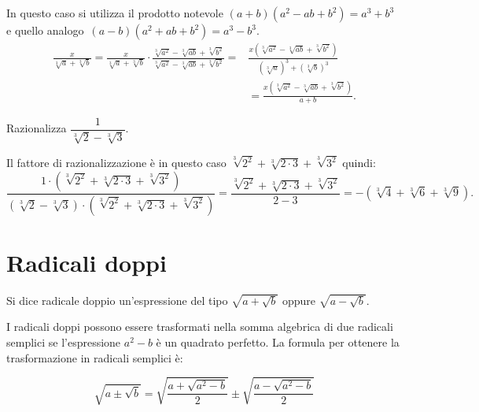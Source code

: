 In questo caso si utilizza il prodotto notevole $(a+b)(a^2-ab+b^2)=a^3+b^3$ e quello analogo~$(a-b)(a^2+ab+b^2)=a^3-b^3$.
\begin{align*}
\frac x{\sqrt[3]a+\sqrt[3]b}=\frac x{\sqrt[3]a+\sqrt[3]b}\cdot \frac{\sqrt[3]{a^2}-\sqrt[3]{ab}+\sqrt[3]{b^2}}{\sqrt[3]{a^2}-\sqrt[3]{ab}+\sqrt[3]{b^2}}=&\frac{x\left(\sqrt[3]{a^2}-\sqrt[3]{ab}+\sqrt[3]{b^2}\right)}{(\sqrt[3]a)^3+(\sqrt[3]b)^3}\\
&=\frac{x\left(\sqrt[3]{a^2}-\sqrt[3]{ab}+\sqrt[3]{b^2}\right)}{a+b}.
\end{align*}

\begin{exrig}
 \begin{esempio}
Razionalizza $\dfrac 1{\sqrt[3]{2}-\sqrt[3]{3}}$.

Il fattore di razionalizzazione è in questo caso $\sqrt[3]{2^2}+\sqrt[3]{2\cdot 3}+\sqrt[3]{3^2}$ quindi:
 \[\dfrac{1\cdot \left(\sqrt[3]{2^2}+\sqrt[3]{2\cdot 3}+\sqrt[3]{3^2}\right)}{\left(\sqrt[3]2-\sqrt[3]3\right)\cdot \left(\sqrt[3]{2^2}+\sqrt[3]{2\cdot 3}+\sqrt[3]{3^2}\right)}=\dfrac{\sqrt[3]{2^2}+\sqrt[3]{2\cdot 3}+\sqrt[3]{3^2}}{2-3}=-\left(\sqrt[3]4+\sqrt[3]6+\sqrt[3]9\right).\]
 \end{esempio}
\end{exrig}
\vspazio\ovalbox{\risolvii \ref{ese:2.68}, \ref{ese:2.69}, \ref{ese:2.70}, \ref{ese:2.71}, \ref{ese:2.72}, \ref{ese:2.73}, \ref{ese:2.74}, \ref{ese:2.75}, \ref{ese:2.76}}

\section{Radicali doppi}
Si dice radicale doppio un'espressione del tipo $\sqrt{a+\sqrt b}$ oppure $\sqrt{a-\sqrt b}$.

I radicali doppi possono essere trasformati nella somma algebrica di due radicali semplici se l'espressione $a^2-b$ è un quadrato perfetto. La formula per ottenere la trasformazione in radicali semplici è:

\begin{equation*}
\sqrt{a\pm \sqrt b}=\sqrt{\dfrac{a+\sqrt{a^2-b}} 2}\pm \sqrt{\dfrac{a-\sqrt{a^2-b}} 2}
\end{equation*}

